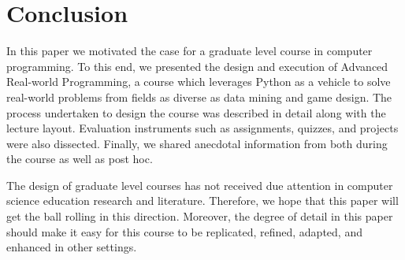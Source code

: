 \documentclass[letterpaper,twocolumn,10pt]{article}
\begin{document}
\section{Conclusion}\label{sec:conclusion}
In this paper we motivated the case for a graduate level course in computer
programming. To this end, we presented the design and execution of Advanced
Real-world Programming, a course which leverages Python as a vehicle to solve
real-world problems from fields as diverse as data mining and game design. The
process undertaken to design the course was described in detail along with the
lecture layout. Evaluation instruments such as assignments, quizzes, and
projects were also dissected. Finally, we shared anecdotal information from both
during the course as well as post hoc.

The design of graduate level courses has not received due attention in computer
science education research and literature. Therefore, we hope that this paper
will get the ball rolling in this direction. Moreover, the degree of detail in
this paper should make it easy for this course to be replicated, refined,
adapted, and enhanced in other settings.

{\footnotesize 
}
\end{document}
